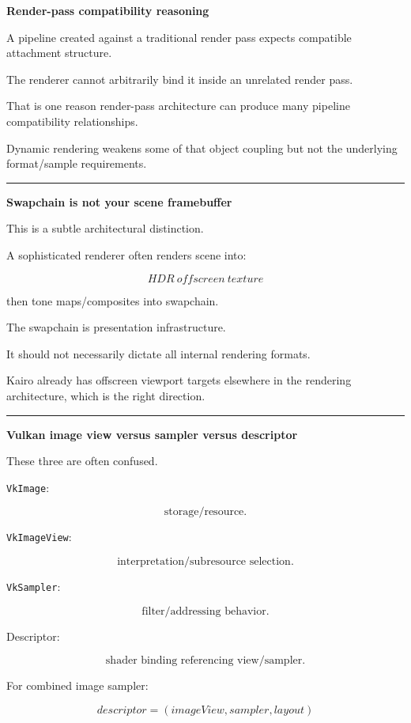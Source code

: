 \textbf{Render-pass compatibility reasoning}

A pipeline created against a traditional render pass expects compatible attachment structure.

The renderer cannot arbitrarily bind it inside an unrelated render pass.

That is one reason render-pass architecture can produce many pipeline compatibility relationships.

Dynamic rendering weakens some of that object coupling but not the underlying format/sample requirements.

\begin{center}\rule{0.5\linewidth}{0.5pt}\end{center}

\textbf{Swapchain is not your scene framebuffer}

This is a subtle architectural distinction.

A sophisticated renderer often renders scene into:

\[
HDR\ offscreen\ texture
\]

then tone maps/composites into swapchain.

The swapchain is presentation infrastructure.

It should not necessarily dictate all internal rendering formats.

Kairo already has offscreen viewport targets elsewhere in the rendering architecture, which is the right direction.

\begin{center}\rule{0.5\linewidth}{0.5pt}\end{center}

\textbf{Vulkan image view versus sampler versus descriptor}

These three are often confused.

\texttt{VkImage}:

\[
\text{storage/resource}.
\]

\texttt{VkImageView}:

\[
\text{interpretation/subresource selection}.
\]

\texttt{VkSampler}:

\[
\text{filter/addressing behavior}.
\]

Descriptor:

\[
\text{shader binding referencing view/sampler}.
\]

For combined image sampler:

\[
\boxed{
descriptor
=
(imageView,sampler,layout)
}
\]

